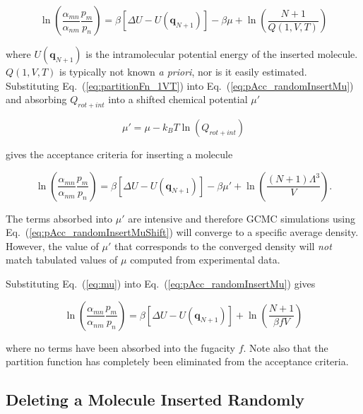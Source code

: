 \begin{equation}
\label{eq:pAcc_randomInsertMu}
\ln\left( \frac{\alpha_{mn}}{\alpha_{nm}} \frac{p_m}{p_n} \right) = \beta \left[\Delta U - U(\mathbf{q}_{N+1})\right] - \beta \mu + \ln\left( \frac{N+1}{Q(1,V,T)} \right)
\end{equation}

\noindent
where $U(\mathbf{q}_{N+1})$ is the intramolecular potential energy of the inserted molecule. $Q(1,V,T)$ is typically not known {\em a priori}, nor is it easily estimated. Substituting Eq.\ (\ref{eq:partitionFn_1VT}) into Eq.\ (\ref{eq:pAcc_randomInsertMu}) and absorbing $Q_{rot+int}$ into a shifted chemical potential $\mu'$

\begin{equation}
\mu' = \mu - k_BT\ln(Q_{rot+int})
\end{equation}

\noindent
gives the acceptance criteria for inserting a molecule

\begin{equation}
\label{eq:pAcc_randomInsertMuShift}
\ln\left( \frac{\alpha_{mn}}{\alpha_{nm}} \frac{p_m}{p_n} \right) = \beta \left[\Delta U - U(\mathbf{q}_{N+1})\right] - \beta \mu' + \ln\left( \frac{(N+1)\Lambda^3}{V} \right).
\end{equation}

\noindent
The terms absorbed into $\mu'$ are intensive and therefore GCMC simulations using Eq.\ (\ref{eq:pAcc_randomInsertMuShift}) will converge to a specific average density. However, the value of $\mu'$ that corresponds to the converged density will {\em not} match tabulated values of $\mu$ computed from experimental data.

Substituting Eq.\ (\ref{eq:mu}) into Eq.\ (\ref{eq:pAcc_randomInsertMu}) gives

\begin{equation}
\label{eq:pAcc_randomInsertF}
\ln\left( \frac{\alpha_{mn}}{\alpha_{nm}} \frac{p_m}{p_n} \right) = \beta \left[\Delta U - U(\mathbf{q}_{N+1})\right] + \ln\left( \frac{N+1}{\beta f V} \right)
\end{equation}

\noindent
where no terms have been absorbed into the fugacity $f$. Note also that the partition function has completely been eliminated from the acceptance criteria.

\subsection{Deleting a Molecule Inserted Randomly}
\label{sec:randomDelete}

